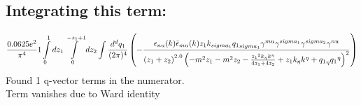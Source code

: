 \subsection*{Integrating this term:}
\begin{dmath}\frac{0.0625 e^{2}}{\pi^{4}}1\int\limits_{ 0 }^{ 1 } d{ z_{ 1 } }\int\limits_{ 0 }^{ - { z_{ 1 } } + 1 } d{ z_{ 2 } }\int\frac{d^d q_1 }{ (2\pi)^4 }\left(- \frac{\epsilon_{ \\nu }({ k }) \bar{\epsilon}_{ \\mu }({ k }) { z_{ 1 } } { { k }_{ \\sigma_1 } } { { q_1 }_{ \\sigma_1 } } { \gamma^{ \\mu } } { \gamma^{ \\sigma_1 } } { \gamma^{ \\sigma_2 } } { \gamma^{ \\nu } }}{\left({ z_{ 1 } } + { z_{ 2 } }\right)^{2.0} \left(- m^{2} { z_{ 1 } } - m^{2} { z_{ 2 } } - \frac{{ z_{ 1 } }^{2} { { k }_{ \eta } } { { k }^{ \eta } }}{4 { z_{ 1 } } + 4 { z_{ 2 } }} + { z_{ 1 } } { { k }_{ \eta } } { { k }^{ \eta } } + { { q_1 }_{ \eta } } { { q_1 }^{ \eta } }\right)^{2}}\right)\end{dmath}
Found 1 q-vector terms in the numerator.\\
Term vanishes due to Ward identity\\
